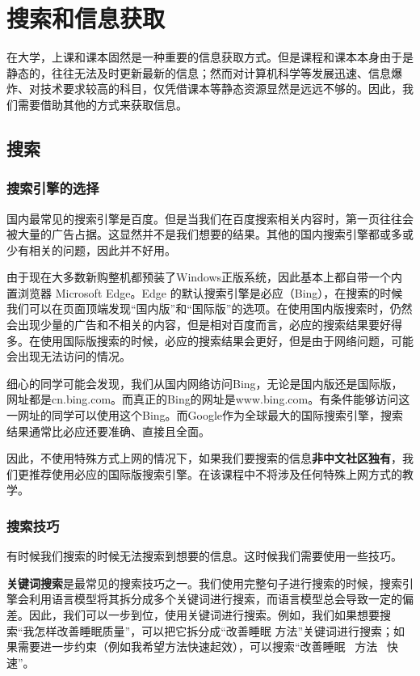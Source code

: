 \documentclass[../main.tex]{subfiles}
\begin{document}
\chapter{搜索和信息获取} %

在大学，上课和课本固然是一种重要的信息获取方式。但是课程和课本本身由于是静态的，往往无法及时更新最新的信息；然而对计算机科学等发展迅速、信息爆炸、对技术要求较高的科目，仅凭借课本等静态资源显然是远远不够的。因此，我们需要借助其他的方式来获取信息。

\section{搜索}

\subsection{搜索引擎的选择}

国内最常见的搜索引擎是百度。但是当我们在百度搜索相关内容时，第一页往往会被大量的广告占据。这显然并不是我们想要的结果。其他的国内搜索引擎都或多或少有相关的问题，因此并不好用。

由于现在大多数新购整机都预装了Windows正版系统，因此基本上都自带一个内置浏览器 Microsoft Edge。Edge 的默认搜索引擎是必应（Bing），在搜索的时候我们可以在页面顶端发现“国内版”和“国际版”的选项。在使用国内版搜索时，仍然会出现少量的广告和不相关的内容，但是相对百度而言，必应的搜索结果要好得多。在使用国际版搜索的时候，必应的搜索结果会更好，但是由于网络问题，可能会出现无法访问的情况。

细心的同学可能会发现，我们从国内网络访问Bing，无论是国内版还是国际版，网址都是cn.bing.com。而真正的Bing的网址是www.bing.com。有条件能够访问这一网址的同学可以使用这个Bing。而Google作为全球最大的国际搜索引擎，搜索结果通常比必应还要准确、直接且全面。

因此，不使用特殊方式上网的情况下，如果我们要搜索的信息\textbf{非中文社区独有}，我们更推荐使用必应的国际版搜索引擎。在该课程中不将涉及任何特殊上网方式的教学。

\subsection{搜索技巧}

有时候我们搜索的时候无法搜索到想要的信息。这时候我们需要使用一些技巧。

\textbf{关键词搜索}是最常见的搜索技巧之一。我们使用完整句子进行搜索的时候，搜索引擎会利用语言模型将其拆分成多个关键词进行搜索，而语言模型总会导致一定的偏差。因此，我们可以一步到位，使用关键词进行搜索。例如，我们如果想要搜索“我怎样改善睡眠质量”，可以把它拆分成“改善睡眠 方法”关键词进行搜索；如果需要进一步约束（例如我希望方法快速起效），可以搜索“改善睡眠 \ 方法 \ 快速”。
\end{document}
